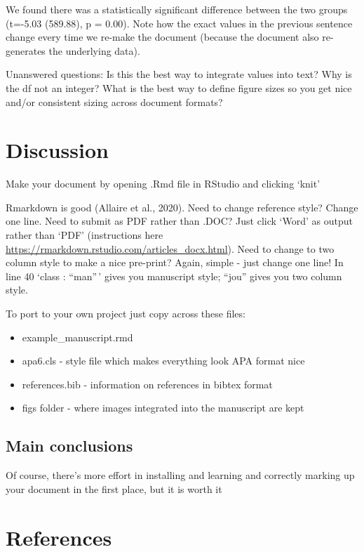 \documentclass[
  english,
  ,jou,floatsintext]{apa6}
\providecommand{\tightlist}{%
  \setlength{\itemsep}{0pt}\setlength{\parskip}{0pt}}
\begin{document}
We found there was a statistically significant difference between the two groups (t=-5.03 (589.88), p = 0.00). Note how the exact values in the previous sentence change every time we re-make the document (because the document also re-generates the underlying data).

Unanswered questions: Is this the best way to integrate values into text? Why is the df not an integer? What is the best way to define figure sizes so you get nice and/or consistent sizing across document formats?

\hypertarget{discussion}{%
\section{Discussion}\label{discussion}}

Make your document by opening .Rmd file in RStudio and clicking `knit'

Rmarkdown is good (Allaire et al., 2020). Need to change reference style? Change one line. Need to submit as PDF rather than .DOC? Just click `Word' as output rather than `PDF' (instructions here \url{https://rmarkdown.rstudio.com/articles_docx.html}). Need to change to two column style to make a nice pre-print? Again, simple - just change one line! In line 40 `class : ``man''\,' gives you manuscript style; ``jou'' gives you two column style.

To port to your own project just copy across these files:

\begin{itemize}
\tightlist
\item
  example\_manuscript.rmd
\item
  apa6.cls - style file which makes everything look APA format nice
\item
  references.bib - information on references in bibtex format
\item
  figs folder - where images integrated into the manuscript are kept
\end{itemize}

\hypertarget{main-conclusions}{%
\subsection{Main conclusions}\label{main-conclusions}}

Of course, there's more effort in installing and learning and correctly marking up your document in the first place, but it is worth it

\hypertarget{references}{%
\section*{References}\label{references}}
\end{document}
